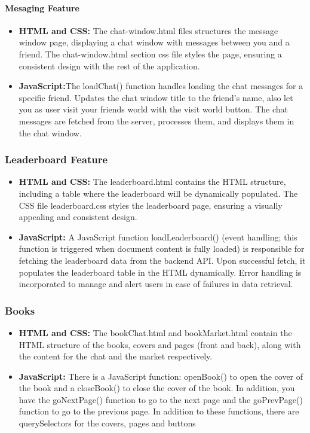 \documentclass[12pt]{article}
\begin{document}
\paragraph{Mesaging Feature}
\begin{itemize}
    \item \textbf{HTML and CSS:} The chat-window.html files structures the message window page, displaying a chat window with messages between you and a friend. The chat-window.html section css file styles the page, ensuring a consistent design with the rest of the application.
    \item \textbf{JavaScript:}The loadChat() function handles loading the chat messages for a specific friend. Updates the chat window title to the friend's name, also let you as user visit your friends world with the visit world button. The chat messages  are fetched from the server, processes them, and displays them in the chat window.
\end{itemize}

\subsubsection{Leaderboard Feature}
\begin{itemize}
    \item \textbf{HTML and CSS:} The leaderboard.html contains the HTML structure, including a table where the leaderboard will be dynamically populated. The CSS file leaderboard.css styles the leaderboard page, ensuring a visually appealing and consistent design.
    \item \textbf{JavaScript:} A JavaScript function loadLeaderboard() (event handling; this function is triggered when document content is fully loaded) is responsible for fetching the leaderboard data from the backend API. Upon successful fetch, it populates the leaderboard table in the HTML dynamically. Error handling is incorporated to manage and alert users in case of failures in data retrieval.
\end{itemize}

\subsubsection{Books}
\begin{itemize}
    \item \textbf{HTML and CSS:} The bookChat.html and bookMarket.html contain the HTML structure of the books, covers and pages (front and back), along with the content for the chat and the market respectively.
    \item \textbf{JavaScript:} There is a JavaScript function: openBook() to open the cover of the book and a closeBook() to close the cover of the book. In addition, you have the goNextPage() function to go to the next page and the goPrevPage() function to go to the previous page. In addition to these functions, there are querySelectors for the covers, pages and buttons
\end{itemize}
\end{document}
